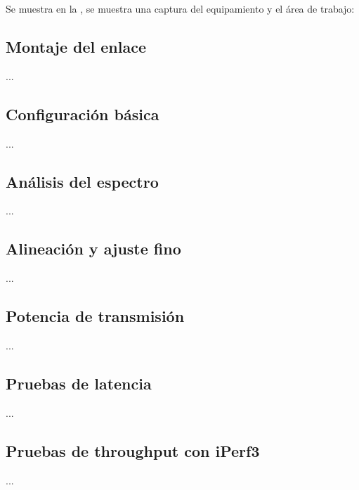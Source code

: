 \endgroup

Se muestra en la                        , se muestra una captura del equipamiento y el área de trabajo:




\subsection{Montaje del enlace}
\label{sec_3.2}
...



\subsection{Configuración básica}
\label{sec_3.3}
...



\subsection{Análisis del espectro}
\label{sec_3.4}
...



\subsection{Alineación y ajuste fino}
\label{sec_3.5}
...



\subsection{Potencia de transmisión}
\label{sec_3.6}
...



\subsection{Pruebas de latencia}
\label{sec_3.7}
...



\subsection{Pruebas de throughput con iPerf3}
\label{sec_3.8}
...



